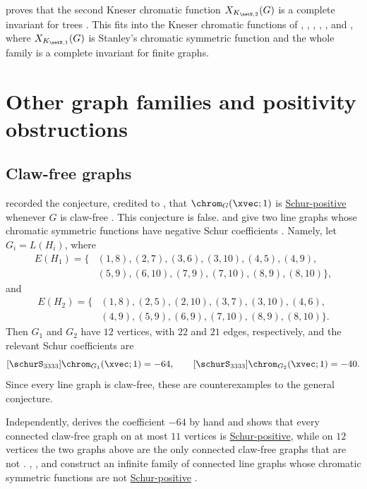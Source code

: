  proves that the second Kneser chromatic function
$X_{K_{\setN,2}}(G)$ is a complete invariant for trees \cite{Nishimura2026}.
This fits into the Kneser chromatic functions of ,
, , ,
, and , where
$X_{K_{\setN,1}}(G)$ is Stanley's chromatic symmetric function and the whole
family is a complete invariant for finite graphs.


\section[chromaticQuasisymmetricGeneralGraphs]{Other graph families and positivity obstructions}


\subsection[chromaticQuasisymmetricClawFree]{Claw-free graphs}

 recorded the conjecture, credited to
, that $\chrom_G(\xvec;1)$ is
\hyperref[schurPositiveDefinition]{Schur-positive} whenever $G$ is claw-free
\cite{Stanley1998}.  This conjecture is false.   and
 give two line graphs whose
chromatic symmetric functions have negative Schur coefficients
\cite{MatherneMorales2026x}.  Namely, let $G_i=L(H_i)$, where
\[
\begin{aligned}
E(H_1)=\{&(1,8),(2,7),(3,6),(3,10),(4,5),(4,9),\\
        &(5,9),(6,10),(7,9),(7,10),(8,9),(8,10)\},
\end{aligned}
\]
and
\[
\begin{aligned}
E(H_2)=\{&(1,8),(2,5),(2,10),(3,7),(3,10),(4,6),\\
        &(4,9),(5,9),(6,9),(7,10),(8,9),(8,10)\}.
\end{aligned}
\]
Then $G_1$ and $G_2$ have $12$ vertices, with $22$ and $21$ edges,
respectively, and the relevant Schur coefficients are
\[
[\schurS_{3333}]\chrom_{G_1}(\xvec;1)=-64,
\qquad
[\schurS_{3333}]\chrom_{G_2}(\xvec;1)=-40.
\]
Since every line graph is claw-free, these are counterexamples to the general
conjecture.

Independently,  derives the coefficient $-64$ by
hand and shows that every connected claw-free graph on at most $11$ vertices
is \hyperref[schurPositiveDefinition]{Schur-positive}, while on $12$ vertices
the two graphs above are the only connected claw-free graphs that are not
\cite{Prajapati2026x}.
, , and  construct an
infinite family of connected line graphs whose chromatic symmetric functions
are not \hyperref[schurPositiveDefinition]{Schur-positive}
\cite{WangZhangZhao2026x}.

